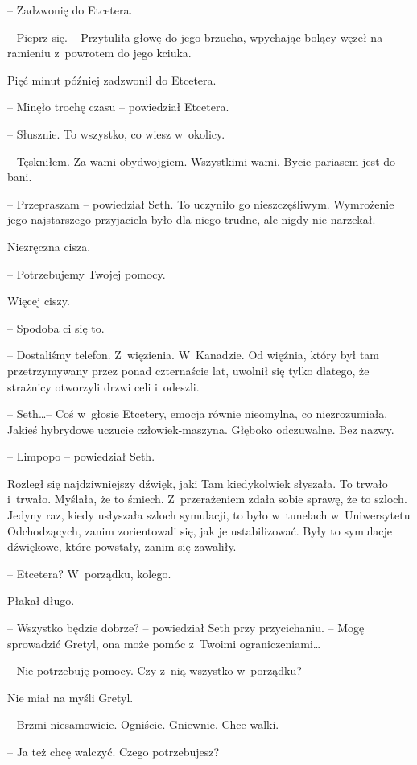 \documentclass[oneside,polish,11pt,sfheadings]{mwbk}
\begin{document}
-- Zadzwonię do Etcetera.

-- Pieprz się. -- Przytuliła głowę do jego brzucha, wpychając bolący węzeł
na ramieniu z~powrotem do jego kciuka.

Pięć minut później zadzwonił do Etcetera.

-- Minęło trochę czasu -- powiedział Etcetera.

-- Słusznie. To wszystko, co wiesz w~okolicy.

-- Tęskniłem. Za wami obydwojgiem. Wszystkimi wami. Bycie pariasem jest
do bani.

-- Przepraszam -- powiedział Seth. To uczyniło go nieszczęśliwym.
Wymrożenie jego najstarszego przyjaciela było dla niego trudne, ale
nigdy nie narzekał.

Niezręczna cisza.

-- Potrzebujemy Twojej pomocy.

Więcej ciszy.

-- Spodoba ci się to.

-- Dostaliśmy telefon. Z~więzienia. W~Kanadzie. Od więźnia, który był tam
przetrzymywany przez ponad czternaście lat, uwolnił się tylko dlatego,
że strażnicy otworzyli drzwi celi i~odeszli.

-- Seth\ldots  -- Coś w~głosie Etcetery, emocja równie nieomylna, co
niezrozumiała. Jakieś hybrydowe uczucie człowiek-maszyna. Głęboko
odczuwalne. Bez nazwy.

-- Limpopo -- powiedział Seth.

Rozległ się najdziwniejszy dźwięk, jaki Tam kiedykolwiek słyszała. To
trwało i~trwało. Myślała, że to śmiech. Z~przerażeniem zdała sobie
sprawę, że to szloch. Jedyny raz, kiedy usłyszała szloch symulacji, to
było w~tunelach w~Uniwersytetu Odchodzących, zanim zorientowali się, jak
je ustabilizować. Były to symulacje dźwiękowe, które powstały, zanim się
zawaliły.

-- Etcetera? W~porządku, kolego.

Płakał długo.

-- Wszystko będzie dobrze? -- powiedział Seth przy przycichaniu. -- Mogę
sprowadzić Gretyl, ona może pomóc z~Twoimi ograniczeniami\ldots 

-- Nie potrzebuję pomocy. Czy z~nią wszystko w~porządku?

Nie miał na myśli Gretyl. 

-- Brzmi niesamowicie. Ogniście. Gniewnie. Chce
walki.

-- Ja też chcę walczyć. Czego potrzebujesz?
\end{document}
